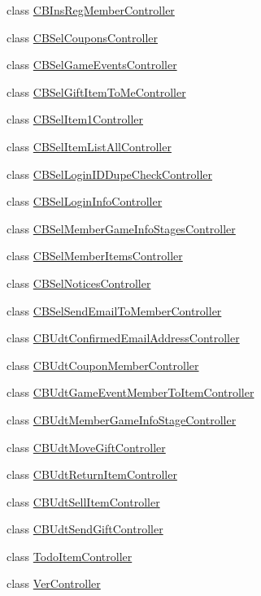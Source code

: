 \begin{DoxyCompactItemize}
class \hyperlink{a00042}{C\+B\+Ins\+Reg\+Member\+Controller}
\item 
class \hyperlink{a00045}{C\+B\+Sel\+Coupons\+Controller}
\item 
class \hyperlink{a00046}{C\+B\+Sel\+Game\+Events\+Controller}
\item 
class \hyperlink{a00047}{C\+B\+Sel\+Gift\+Item\+To\+Me\+Controller}
\item 
class \hyperlink{a00048}{C\+B\+Sel\+Item1\+Controller}
\item 
class \hyperlink{a00049}{C\+B\+Sel\+Item\+List\+All\+Controller}
\item 
class \hyperlink{a00050}{C\+B\+Sel\+Login\+I\+D\+Dupe\+Check\+Controller}
\item 
class \hyperlink{a00051}{C\+B\+Sel\+Login\+Info\+Controller}
\item 
class \hyperlink{a00052}{C\+B\+Sel\+Member\+Game\+Info\+Stages\+Controller}
\item 
class \hyperlink{a00053}{C\+B\+Sel\+Member\+Items\+Controller}
\item 
class \hyperlink{a00054}{C\+B\+Sel\+Notices\+Controller}
\item 
class \hyperlink{a00055}{C\+B\+Sel\+Send\+Email\+To\+Member\+Controller}
\item 
class \hyperlink{a00056}{C\+B\+Udt\+Confirmed\+Email\+Address\+Controller}
\item 
class \hyperlink{a00057}{C\+B\+Udt\+Coupon\+Member\+Controller}
\item 
class \hyperlink{a00058}{C\+B\+Udt\+Game\+Event\+Member\+To\+Item\+Controller}
\item 
class \hyperlink{a00059}{C\+B\+Udt\+Member\+Game\+Info\+Stage\+Controller}
\item 
class \hyperlink{a00060}{C\+B\+Udt\+Move\+Gift\+Controller}
\item 
class \hyperlink{a00061}{C\+B\+Udt\+Return\+Item\+Controller}
\item 
class \hyperlink{a00062}{C\+B\+Udt\+Sell\+Item\+Controller}
\item 
class \hyperlink{a00063}{C\+B\+Udt\+Send\+Gift\+Controller}
\item 
class \hyperlink{a00188}{Todo\+Item\+Controller}
\item 
class \hyperlink{a00191}{Ver\+Controller}
\end{DoxyCompactItemize}
